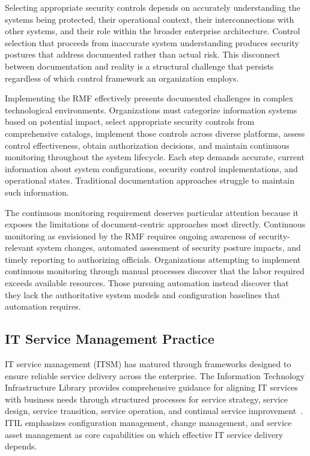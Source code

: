 Selecting appropriate security controls depends on accurately understanding the systems being protected, their operational context, their interconnections with other systems, and their role within the broader enterprise architecture. Control selection that proceeds from inaccurate system understanding produces security postures that address documented rather than actual risk. This disconnect between documentation and reality is a structural challenge that persists regardless of which control framework an organization employs.

Implementing the RMF effectively presents documented challenges in complex technological environments. Organizations must categorize information systems based on potential impact, select appropriate security controls from comprehensive catalogs, implement those controls across diverse platforms, assess control effectiveness, obtain authorization decisions, and maintain continuous monitoring throughout the system lifecycle. Each step demands accurate, current information about system configurations, security control implementations, and operational states. Traditional documentation approaches struggle to maintain such information.

The continuous monitoring requirement deserves particular attention because it exposes the limitations of document-centric approaches most directly. Continuous monitoring as envisioned by the RMF requires ongoing awareness of security-relevant system changes, automated assessment of security posture impacts, and timely reporting to authorizing officials. Organizations attempting to implement continuous monitoring through manual processes discover that the labor required exceeds available resources. Those pursuing automation instead discover that they lack the authoritative system models and configuration baselines that automation requires.

\subsection{IT Service Management Practice}

IT service management (ITSM) has matured through frameworks designed to ensure reliable service delivery across the enterprise. The Information Technology Infrastructure Library provides comprehensive guidance for aligning IT services with business needs through structured processes for service strategy, service design, service transition, service operation, and continual service improvement~\parencite{Cannon_AXELOS_2013}. ITIL emphasizes configuration management, change management, and service asset management as core capabilities on which effective IT service delivery depends.

